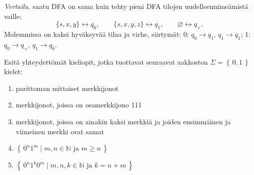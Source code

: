 \documentclass[12pt,a4paper]{article}
\newcommand{\set}[1]{\left\{\,#1\,\right\}}
\newcommand{\N}{\mathbb{N}}
\begin{document}
\begin{kohta}

\item \emph{Vertailu.}
saatu DFA on sama kuin tehty pieni DFA
tilojen uudelleennimeämistä vaille:
\[
\{s,x,y\}\leftrightarrow q_0,\qquad
\{s,x,y,z\}\leftrightarrow q_1,\qquad
\varnothing\leftrightarrow q_\times.
\]
Molemmissa on kaksi hyväksyvää tilaa ja virhe, siirtymät:
$0$: $q_0\!\to\!q_1$, $q_1\!\to\!q_1$; \quad
$1$: $q_0\!\to\!q_\times$, $q_1\!\to\!q_0$.
\end{kohta}






\pagebreak
{}
Esitä yhteydettömät kieliopit, jotka tuottavat seuraavat
aakkoston $\Sigma=\set{0,1}$ kielet:
\begin{enumerate}
\item
parittoman mittaiset merkkijonot
\item merkkijonot, joissa on osamerkkijono 111
\item
merkkijonot, joissa on ainakin kaksi merkkiä ja joiden
ensimmäinen ja viimeinen merkki ovat samat
\item $\set{0^n1^m\mid\mbox{$m,n\in\N$ ja $m\geq n$}}$
\item $\set{0^n1^k0^m\mid\mbox{$m,n,k\in\N$ ja $k=n+m$}}$
\end{enumerate}
\end{document}
